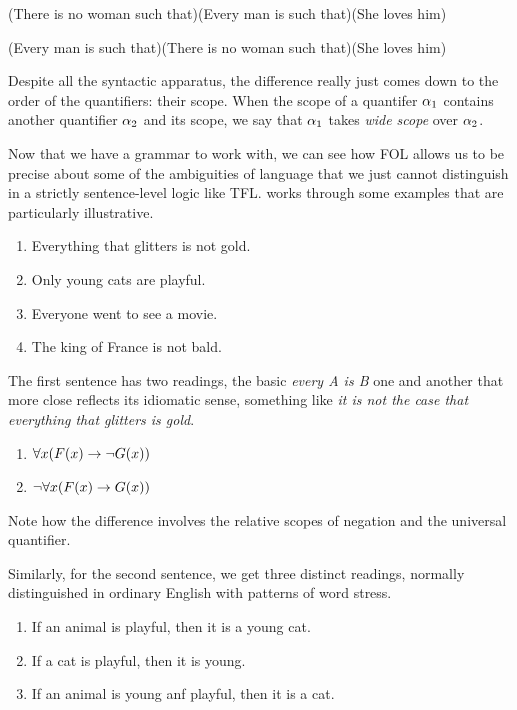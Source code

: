 \begin{argument}
\item[ ] (There is no woman such that)(Every man is such that)(She loves him)
\item[ ] (Every man is such that)(There is no woman such that)(She loves him)
\end{argument}

Despite all the syntactic apparatus, the difference really just comes down to
the order of the quantifiers: their scope. When the scope of a quantifer
$\alpha_1$ contains another quantifier $\alpha_2$ and its scope, we say that
$\alpha_1$ takes \emph{wide scope} over $\alpha_2$.

Now that we have a grammar to work with, we can see how FOL allows us to be
precise about some of the ambiguities of language that we just cannot
distinguish in a strictly sentence-level logic like TFL.
\cite[Chapter 29]{Mag25} works through some examples that are
particularly illustrative.

\begin{enumerate}
\item Everything that glitters is not gold.
\item Only young cats are playful.
\item Everyone went to see a movie.
\item The king of France is not bald.
\end{enumerate}

The first sentence has two readings, the basic \emph{every A is B} one and
another that more close reflects its idiomatic sense, something like
\emph{it is not the case that everything that glitters is gold}. 

\begin{enumerate}
\item $\forall x(F(x)\rightarrow\neg G(x))$
\item $\neg\forall x(F(x)\rightarrow G(x))$
\end{enumerate}

Note how the difference involves the relative scopes of negation and the
universal quantifier.

Similarly, for the second sentence, we get three distinct readings, normally
distinguished in ordinary English with patterns of word stress.

\begin{enumerate}
\item If an animal is playful, then it is a young cat.
\item If a cat is playful, then it is young.
\item If an animal is young anf playful, then it is a cat. 
\end{enumerate}

